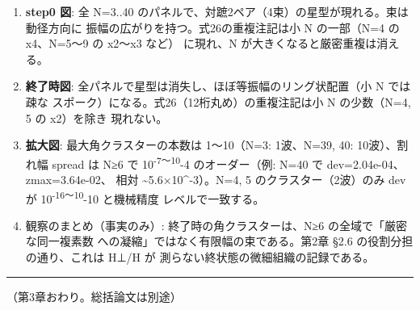 \documentclass[
  a4paper,
]{ltjsarticle}
\providecommand{\tightlist}{%
  \setlength{\itemsep}{0pt}\setlength{\parskip}{0pt}}
\begin{document}
\begin{enumerate}
\def\labelenumi{\arabic{enumi}.}
\tightlist
\item
  \textbf{step0 図}: 全 N=3..40
  のパネルで、対蹠2ペア（4束）の星型が現れる。束は動径方向に
  振幅の広がりを持つ。式26の重複注記は小 N の一部（N=4 の x4、N=5〜9 の
  x2〜x3 など） に現れ、N が大きくなると厳密重複は消える。
\item
  \textbf{終了時図}:
  全パネルで星型は消失し、ほぼ等振幅のリング状配置（小 N では疎な
  スポーク）になる。式26（12桁丸め）の重複注記は小 N の少数（N=4, 5 の
  x2）を除き 現れない。
\item
  \textbf{拡大図}: 最大角クラスターの本数は 1〜10（N=3: 1波、N=39, 40:
  10波）、割れ幅 spread は N≥6 で 10\textsuperscript{-7〜10}-4
  のオーダー（例: N=40 で
  dev=2.04e-04、\textbar z\textbar max=3.64e-02、 相対
  \textasciitilde5.6×10\^{}-3）。N=4, 5 のクラスター（2波）のみ dev が
  10\textsuperscript{-16〜10}-10 と機械精度 レベルで一致する。
\item
  観察のまとめ（事実のみ）: 終了時の角クラスターは、N≥6
  の全域で「厳密な同一複素数 への凝縮」ではなく有限幅の束である。第2章
  §2.6 の役割分担の通り、これは H⊥/H が
  測らない終状態の微細組織の記録である。
\end{enumerate}

\begin{center}\rule{0.5\linewidth}{0.5pt}\end{center}

（第3章おわり。総括論文は別途）
\end{document}
